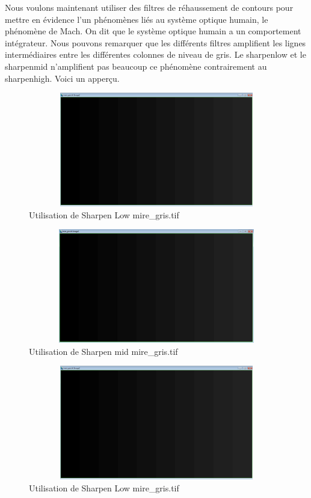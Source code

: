 \documentclass{scrreprt}
\begin{document}
Nous voulons maintenant utiliser des filtres de réhaussement de contours pour mettre en évidence l'un phénomènes liés au système optique humain, 
le phénomène de Mach. On dit que le système optique humain a un comportement intégrateur.
Nous pouvons remarquer que les différents filtres amplifient les lignes intermédiaires entre les différentes colonnes de niveau de gris.
Le sharpenlow et le sharpenmid n'amplifient pas beaucoup ce phénomène contrairement au sharpenhigh. 
Voici un apperçu. 

\begin{figure}[!h]
\centering
\includegraphics[height=5cm,width=15cm]{images/sharpenlow.png}
\caption{Utilisation de Sharpen Low mire_gris.tif}
\end{figure}

\begin{figure}[!h]
\centering
\includegraphics[height=5cm,width=15cm]{images/sharpenmid.png}     
\caption{Utilisation de Sharpen mid mire_gris.tif}
\end{figure}

\begin{figure}[!h]
\centering
\includegraphics[height=5cm,width=15cm]{images/sharpenlow.png}     
\caption{Utilisation de Sharpen Low mire_gris.tif}
\end{figure}
  
\end{document}
